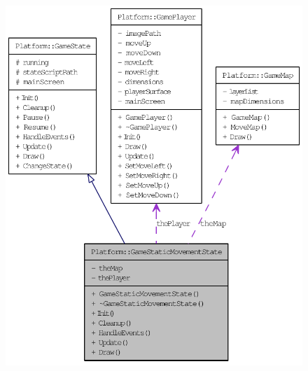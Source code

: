 \begin{figure}[H]
\begin{center}
\leavevmode
\includegraphics[width=400pt]{d8/d10/class_platform_1_1_game_static_movement_state__coll__graph}
\end{center}
\end{figure}
